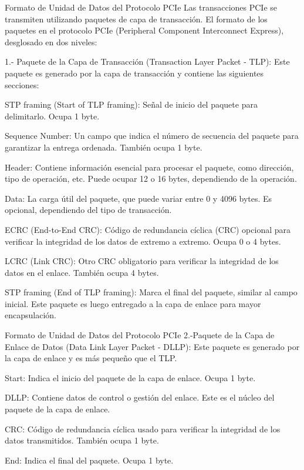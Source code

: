 \documentclass[presentation]{beamer}
\begin{document}
\begin{frame}[label={sec:orgfdf432a}]{Formato de Unidad de Datos del Protocolo PCIe}
Las transacciones PCIe se transmiten utilizando paquetes de capa de transacción.
El formato de los paquetes en el protocolo PCIe (Peripheral Component Interconnect Express), desglosado en dos niveles:

1.- Paquete de la Capa de Transacción (Transaction Layer Packet - TLP):
Este paquete es generado por la capa de transacción y contiene las siguientes secciones:

\alert{\alert{STP framing (Start of TLP framing):}} Señal de inicio del paquete para delimitarlo. Ocupa 1 byte.

\alert{\alert{Sequence Number:}} Un campo que indica el número de secuencia del paquete para garantizar la entrega ordenada. También ocupa 1 byte.

\alert{\alert{Header:}} Contiene información esencial para procesar el paquete, como dirección, tipo de operación, etc. Puede ocupar 12 o 16 bytes, dependiendo de la operación.

\alert{\alert{Data:}} La carga útil del paquete, que puede variar entre 0 y 4096 bytes. Es opcional, dependiendo del tipo de transacción.

\alert{\alert{ECRC (End-to-End CRC):}} Código de redundancia cíclica (CRC) opcional para verificar la integridad de los datos de extremo a extremo. Ocupa 0 o 4 bytes.

\alert{\alert{LCRC (Link CRC):}} Otro CRC obligatorio para verificar la integridad de los datos en el enlace. También ocupa 4 bytes.

\alert{\alert{STP framing (End of TLP framing):}} Marca el final del paquete, similar al campo inicial.
Este paquete es luego entregado a la capa de enlace para mayor encapsulación.
\end{frame}

\begin{frame}[label={sec:org2600b64}]{Formato de Unidad de Datos del Protocolo PCIe}
2.-Paquete de la Capa de Enlace de Datos (Data Link Layer Packet - DLLP):
Este paquete es generado por la capa de enlace y es más pequeño que el TLP.

\alert{\alert{Start:}} Indica el inicio del paquete de la capa de enlace. Ocupa 1 byte.

\alert{\alert{DLLP:}} Contiene datos de control o gestión del enlace. Este es el núcleo del paquete de la capa de enlace.

\alert{\alert{CRC:}} Código de redundancia cíclica usado para verificar la integridad de los datos transmitidos. También ocupa 1 byte.

\alert{\alert{End:}} Indica el final del paquete. Ocupa 1 byte.
\end{frame}
\end{document}
